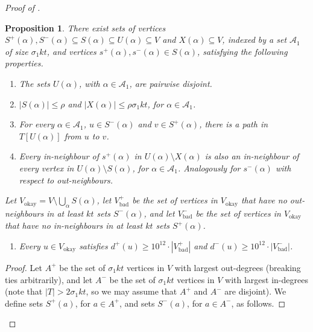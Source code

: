 \documentclass[english]{article}
\theoremstyle{plain}
\newtheorem{proposition}[theorem]{Proposition}
\theoremstyle{remark}
\def \Sp {S^+}
\def \Sm {S^-}
\def \sp {s^+}
\def \smm {s^-}
\def \Ap {A^+}
\def \Am {A^-}
\def \dpp {d^+}
\def \dm {d^-}
\def \Vbp {V_{\bad}^+}
\def \Vbm {V_{\bad}^-}
\def \Vo {V_{\okay}}
\newcommand{\sm}{\setminus}
\newcommand{\A}{\mathcal{A}}
\DeclareMathOperator{\bad}{bad}
\DeclareMathOperator{\okay}{okay}
\begin{document}
\begin{proof}[Proof of ]
		\begin{proposition} \label{prop:gadgets}
			There exist sets of vertices $\Sp(\alpha), \Sm(\alpha) \subseteq S(\alpha) \subseteq U(\alpha) \subseteq V$ and $X(\alpha) \subseteq V$, indexed by a set $\A_1$ of size $\sigma_1 kt$, and vertices $\sp(\alpha), \smm(\alpha) \in S(\alpha)$, satisfying the following properties.
			\begin{enumerate} [label = \rm(G\arabic*)]
				\item \label{itm:gadget-disjoint}
					The sets $U(\alpha)$, with $\alpha \in \A_1$, are pairwise disjoint.
				\item \label{itm:gadget-Y-small}
					$|S(\alpha)| \le \rho$ and $|X(\alpha)| \le \rho \sigma_1 kt$, for $\alpha \in \A_1$.
				\item \label{itm:gadget-path}
					For every $\alpha \in \A_1$, $u \in \Sm(\alpha)$ and $v \in \Sp(\alpha)$, there is a path in $T[U(\alpha)]$ from $u$ to $v$.
				\item \label{itm:gadget-neighbourhood}
					Every in-neighbour of $\sp(\alpha)$ in $U(\alpha) \sm X(\alpha)$ is also an in-neighbour of every vertex in $U(\alpha) \setminus S(\alpha)$, for $\alpha \in \A_1$.
					Analogously for $\smm(\alpha)$ with respect to out-neighbours.
			\end{enumerate}

			Let $\Vo = V \setminus \bigcup_{\alpha} S(\alpha)$, let $\Vbp$ be the set of vertices in $\Vo$ that have no out-neighbours in at least $kt$ sets $\Sm(\alpha)$, and let $\Vbm$ be the set of vertices in $\Vo$ that have no in-neighbours in at least $kt$ sets $\Sp(\alpha)$.
			\begin{enumerate} [resume, label = \rm(G\arabic*)]
				\item \label{itm:gadget-good}
					Every $u \in \Vo$ satisfies $\dpp(u) \ge 10^{12} \cdot |\Vbp|$ and $\dm(u) \ge 10^{12} \cdot |\Vbm|$.
			\end{enumerate}
		\end{proposition}

		\begin{proof}

			Let $\Ap$ be the set of $\sigma_1 kt$ vertices in $V$ with largest out-degrees (breaking ties arbitrarily), and let $\Am$ be the set of $\sigma_1 kt$ vertices in $V$ with largest in-degrees (note that $|T| > 2 \sigma_1 kt$, so we may assume that $\Ap$ and $\Am$ are disjoint). We define sets $\Sp(a)$, for $a \in \Ap$, and sets $\Sm(a)$, for $a \in \Am$, as follows.


\end{proof}
\end{proof}
\end{document}
